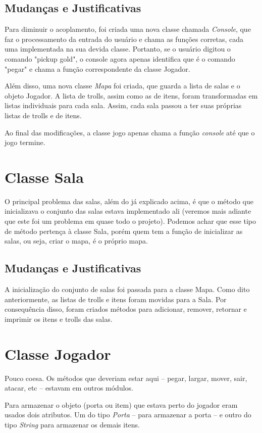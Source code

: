 \documentclass[runningheads,a4paper]{llncs}
\begin{document}
    \subsection{Mudanças e Justificativas}
        Para diminuir o acoplamento, foi criada uma nova classe chamada \emph{Console}, que faz o processamento da entrada do usuário e chama as funções corretas, cada uma implementada na sua devida classe. Portanto, se o usuário digitou o comando "pickup gold", o console agora apenas identifica que é o comando "pegar" e chama a função correspondente da classe Jogador.
        
        Além disso, uma nova classe \emph{Mapa} foi criada, que guarda a lista de salas e o objeto Jogador. A lista de trolls, assim como as de itens, foram transformadas em listas individuais para cada sala. Assim, cada sala passou a ter suas próprias listas de trolls e de itens.
        
        Ao final das modificações, a classe jogo apenas chama a função \emph{console} até que o jogo termine.

\section{Classe Sala}
    O principal problema das salas, além do já explicado acima, é que o método que inicializava o conjunto das salas estava implementado ali (veremos mais adiante que este foi um problema em quase todo o projeto). Podemos achar que esse tipo de método pertença à classe Sala, porém quem tem a função de inicializar as salas, ou seja, criar o mapa, é o próprio mapa.

    \subsection{Mudanças e Justificativas}
        A inicialização do conjunto de salas foi passada para a classe Mapa. Como dito anteriormente, as listas de trolls e itens foram movidas para a Sala. Por consequência disso, foram criados métodos para adicionar, remover, retornar e imprimir os itens e trolls das salas.

\section{Classe Jogador}
    Pouco coesa. Os métodos que deveriam estar aqui -- pegar, largar, mover, sair, atacar, etc -- estavam em outros módulos.
    
    Para armazenar o objeto (porta ou item) que estava perto do jogador eram usados dois atributos. Um do tipo \emph{Porta} -- para armazenar a porta -- e outro do tipo \emph{String} para armazenar os demais itens.
\end{document}
